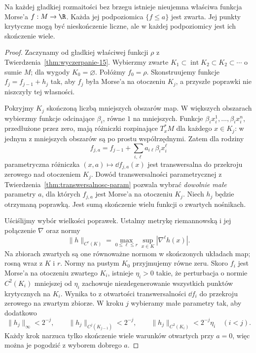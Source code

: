 \begin{twierdzenie}
\label{thm:wlasciwa-morse-15}
Na każdej gładkiej rozmaitości bez brzegu
istnieje nieujemna właściwa funkcja Morse'a $f:M\to\R$.
Każda jej podpoziomica $\{f\leq a\}$ jest zwarta.
Jej punkty krytyczne mogą być nieskończenie liczne,
ale w każdej podpoziomicy jest ich skończenie wiele.
\end{twierdzenie}
\begin{proof}
Zaczynamy od gładkiej właściwej
funkcji $\rho$ z
Twierdzenia~\ref{thm:wyczerpanie-15}.
Wybierzmy zwarte
$K_1\subset\operatorname{int}K_2
\subset K_2\subset\cdots$
o sumie $M$; dla wygody
$K_0=\varnothing$. Połóżmy $f_0=\rho$.
Skonstruujemy funkcje
$f_j=f_{j-1}+h_j$ tak, aby $f_j$
była Morse'a na otoczeniu $K_j$,
a przyszłe poprawki nie niszczyły
tej własności.

Pokryjmy $K_j$ skończoną liczbą
mniejszych obszarów map. W większych
obszarach wybierzmy funkcje
odcinające $\beta_i$, równe $1$
na mniejszych. Funkcje
$\beta_i x_i^1,\ldots,\beta_i x_i^n$,
przedłużone przez zero, mają
różniczki rozpinające $T_x^*M$
dla każdego $x\in K_j$:
w jednym z mniejszych obszarów
są po prostu współrzędnymi.
Zatem dla rodziny
\[
 f_{j,a}=f_{j-1}
       +\sum_{i,\ell}a_{i\ell}\beta_i x_i^\ell
\]
parametryczna różniczka
$(x,a)\mapsto\dd f_{j,a}(x)$
jest transwersalna do przekroju
zerowego nad otoczeniem $K_j$.
Dowód transwersalności
parametrycznej z
Twierdzenia~\ref{thm:transwersalnosc-param}
pozwala wybrać \emph{dowolnie
małe} parametry $a$, dla których
$f_{j,a}$ jest Morse'a na
otoczeniu $K_j$. Niech $h_j$
będzie otrzymaną poprawką.
Jest sumą skończenie wielu
funkcji o zwartych nośnikach.

Uściślijmy wybór wielkości poprawek. Ustalmy
metrykę riemannowską i jej połączenie $\nabla$ oraz normy
\[
 \|h\|_{C^r(K)}=\max_{0\leq\ell\leq r}
       \sup_{x\in K}|\nabla^\ell h(x)|.
\]
Na zbiorach zwartych są one równoważne normom
w skończonych układach map; rosną wraz z $K$ i $r$.
Normy na pustym $K_0$ przyjmujemy równe zeru.
Skoro $f_i$ jest Morse'a na
otoczeniu zwartego $K_i$,
istnieje $\eta_i>0$ takie,
że perturbacja o normie
$C^2(K_i)$ mniejszej od
$\eta_i$ zachowuje
niezdegenerowanie wszystkich
punktów krytycznych na $K_i$.
Wynika to z otwartości
transwersalności $\dd f_i$
do przekroju zerowego
na zwartym zbiorze.
W kroku $j$ wybieramy małe
parametry tak, aby dodatkowo
\[
 \|h_j\|_\infty<2^{-j},\qquad
 \|h_j\|_{C^j(K_{j-1})}<2^{-j},\qquad
 \|h_j\|_{C^2(K_i)}
          <2^{-j}\eta_i\quad(i<j).
\]
Każdy krok narzuca tylko
skończenie wiele warunków
otwartych przy $a=0$,
więc można je pogodzić
z wyborem dobrego $a$.


\end{proof}

